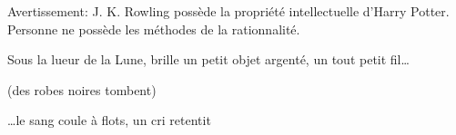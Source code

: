 Avertissement: J. K. Rowling possède la propriété intellectuelle d'Harry Potter. Personne ne possède les méthodes de la rationnalité.

\begin{em}
Sous la lueur de la Lune, brille un petit objet argenté, un tout petit fil{\ldots}

(des robes noires tombent)

{\ldots}le sang coule à flots, un cri retentit
\end{em}
